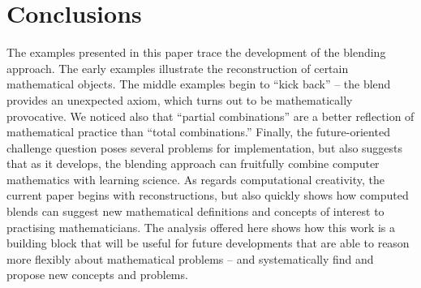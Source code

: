 \section{Conclusions}
\label{sec:conc}

The examples presented in this paper trace the development of the
blending approach.  The early examples illustrate the reconstruction
of certain mathematical objects.  The middle examples begin to ``kick
back'' -- the blend provides an unexpected axiom, which turns out to
be mathematically provocative.  We noticed also that ``partial
combinations'' are a better reflection of mathematical practice than
``total combinations.''  Finally, the future-oriented challenge
question poses several problems for implementation, but also suggests
that as it develops, the blending approach can fruitfully combine
computer mathematics with learning science.  As regards computational
creativity, the current paper begins with reconstructions, but also
quickly shows how computed blends can suggest new mathematical
definitions and concepts of interest to practising mathematicians.
The analysis offered here shows how this work is a building block that
will be useful for future developments that are able to reason more
flexibly about mathematical problems -- and systematically find and
propose new concepts and problems.

